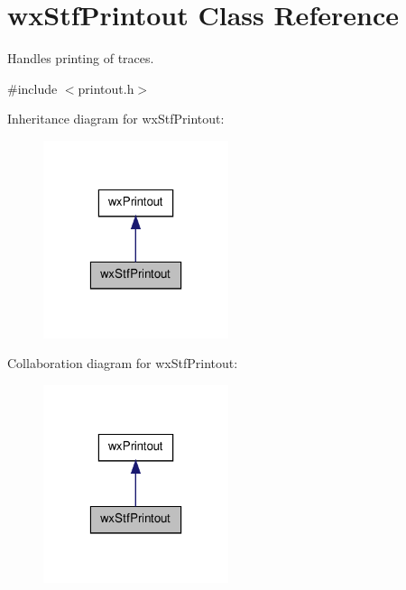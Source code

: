 \hypertarget{classwxStfPrintout}{
\section{wxStfPrintout Class Reference}
\label{classwxStfPrintout}
}


Handles printing of traces.  




{\ttfamily \#include $<$printout.h$>$}



Inheritance diagram for wxStfPrintout:
\nopagebreak
\begin{figure}[H]
\begin{center}
\leavevmode
\includegraphics[width=154pt]{classwxStfPrintout__inherit__graph}
\end{center}
\end{figure}


Collaboration diagram for wxStfPrintout:
\nopagebreak
\begin{figure}[H]
\begin{center}
\leavevmode
\includegraphics[width=154pt]{classwxStfPrintout__coll__graph}
\end{center}
\end{figure}
